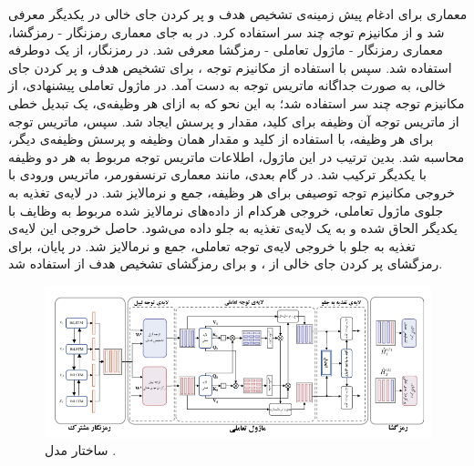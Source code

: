 معماری  \cite{Qin:2021} برای ادغام پیش زمینه‌ی تشخیص هدف و پر کردن جای خالی در یکدیگر معرفی شد و از مکانیزم توجه چند سر \cite{transformer} استفاده کرد. در  به جای معماری رمزنگار - رمزگشا، معماری رمزنگار - ماژول تعاملی - رمزگشا معرفی شد. در رمزنگار، از یک  دوطرفه استفاده شد. سپس با استفاده از مکانیزم توجه \cite{attention_bahdanau}، برای تشخیص هدف و پر کردن جای خالی، به صورت جداگانه ماتریس توجه به دست آمد. در ماژول تعاملی پیشنهادی، از مکانیزم توجه چند سر \cite{transformer} استفاده شد؛ به این نحو که به ازای هر وظیفه‌ی، یک تبدیل خطی از ماتریس توجه آن وظیفه برای کلید، مقدار و پرسش ایجاد شد. سپس، ماتریس توجه برای هر وظیفه، با استفاده از کلید و مقدار همان وظیفه و پرسش وظیفه‌ی دیگر، محاسبه شد. بدین ترتیب در این ماژول، اطلاعات ماتریس توجه مربوط به هر دو وظیفه با یکدیگر ترکیب شد. در گام بعدی، مانند معماری ترنسفورمر، ماتریس ورودی با خروجی مکانیزم توجه توصیفی برای هر وظیفه، جمع و نرمالایز شد. در لایه‌ی تغذیه به جلو‌ی ماژول تعاملی، خروجی هرکدام از داده‌های نرمالایز شده مربوط به وظایف با یکدیگر الحاق شده و به یک لایه‌ی تغذیه به جلو داده می‌شود. حاصل خروجی این لایه‌ی تغذیه به جلو با خروجی لایه‌ی توجه تعاملی، جمع و نرمالایز شد. در پایان، برای رمزگشای پر کردن جای خالی از ، و برای رمزگشای تشخیص هدف از  استفاده شد.
\begin{figure}[!htb]
	\centering
	\includegraphics[scale=1.12]{Figures/cointeractive.pdf}
	\caption[ساختار مدل ]{ساختار مدل  \cite{Qin:2021}.}
	\label{Fig:cointeractive}
\end{figure}


